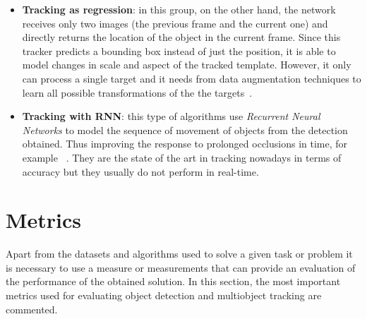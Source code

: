 \begin{itemize}
\item \textbf{Tracking as regression}: in this group, on the other hand, the network receives only two images (the previous frame and the current one) and directly returns the location of the object in the current frame. Since this tracker predicts a bounding box instead of just the position, it is able to model changes in scale and aspect of the tracked template. However, it only can process a single target and it needs from data augmentation techniques to learn all possible transformations of the the targets~\cite{held2016learning}.
\item \textbf{Tracking with RNN}: this type of algorithms use \textit{Recurrent Neural Networks} to model the sequence of movement of objects from the detection obtained. Thus improving the response to prolonged occlusions in time, for example ~\cite{sadeghian2017tracking}. They are the state of the art in tracking nowadays in terms of accuracy but they usually do not perform in real-time.
\end{itemize}
\section{Metrics}
Apart from the datasets and algorithms used to solve a given task or problem it is necessary to use a measure or measurements that can provide an evaluation of the performance of the obtained solution. In this section, the most important metrics used for evaluating object detection and multiobject tracking are commented.
